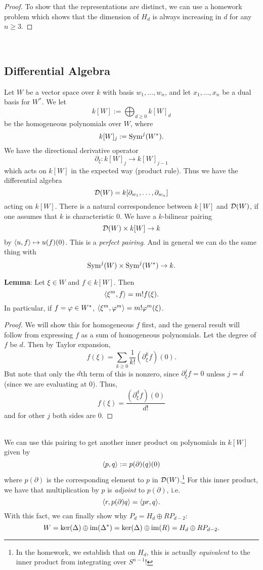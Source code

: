 \documentclass{amsart}
\begin{document}
\begin{proof}
	To show that the representations are distinct, we can use a homework problem which shows that the dimension of $H_d$ is always increasing in $d$ for any $n\geq 3$.
\end{proof}\\

\subsection{Differential Algebra}

Let $W$ be a vector space over $k$ with basis $w_1,\dots,w_n$, and let $x_1,\dots,x_n$ be a dual basis for $W^*$. We let
$$
k[W] := \bigoplus_{d\geq 0} k[W]_d
$$
be the homogeneous polynomials over $W$, where 
$$
k[W]_j := \operatorname{Sym}^j(W^*).
$$
We have the directional derivative operator
$$
\partial_{\xi} : k[W]_j \to k[W]_{j-1}
$$
which acts on $k[W]$ in the expected way (product rule). Thus we have the differential algebra
$$
\mathcal{D}(W) = k[\partial_{w_1},\dots,\partial_{w_n}]
$$
acting on $k[W]$. There is a natural correspondence between $k[W]$ and $\mathcal{D}(W)$, if one assumes that $k$ is characteristic 0. We have a $k$-bilinear pairing 
$$
\mathcal{D}(W) \times k[W] \to k
$$
by $\langle u,f\rangle\mapsto u(f)(0)$. This is a \textit{perfect pairing}. And in general we can do the same thing with 
$$
\operatorname{Sym}^j(W)\times \operatorname{Sym}^j(W^*)\to k.
$$

\noindent \textbf{Lemma}: Let $\xi\in W$ and $f\in k[W]$. Then
$$\langle\xi^m,f\rangle = m!f(\xi).$$
In particular, if $f=\varphi\in W^*$, $\langle\xi^m,\varphi^m\rangle=m!\varphi^m(\xi)$.
\begin{proof}
	We will show this for homogeneous $f$ first, and the general result will follow from expressing $f$ as a sum of homogeneous polynomials. Let the degree of $f$ be $d$. Then by Taylor expansion,
	$$f(\xi) = \sum_{k\geq 0} \frac{1}{k!}(\partial_{\xi}^kf)(0).$$
	But note that only the $d$th term of this is nonzero, since $\partial^j_{\xi}f= 0$ unless $j=d$ (since we are evaluating at $0$). Thus,
	$$
	f(\xi) = \frac{(\partial^d_{\xi}f)(0)}{d!}
	$$
	and for other $j$ both sides are 0.
\end{proof}\\

We can use this pairing to get another inner product on polynomials in $k[W]$ given by
$$
\langle p,q\rangle := p(\partial)(q)(0)
$$
where $p(\partial)$ is the corresponding element to $p$ in $\mathcal{D}(W)$.\footnote{In the homework, we establish that on $H_d$, this is actually \textit{equivalent} to the inner product from integrating over $S^{n-1}$!} For this inner product, we have that multiplication by $p$ is \textit{adjoint} to $p(\partial)$, i.e.
$$
\langle r,p(\partial)q\rangle = \langle pr,q\rangle.
$$
With this fact, we can finally show why $P_d = H_d \oplus R P_{d-2}$:
$$
W = \ker(\Delta) \oplus \operatorname{im}(\Delta^*) = \ker(\Delta) \oplus \operatorname{im}(R) = H_d \oplus R P_{d-2}.
$$
\end{document}
